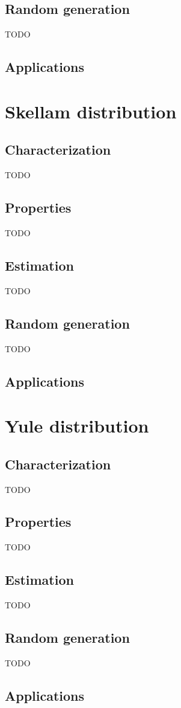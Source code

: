 \subsection{Random generation}
TODO
\subsection{Applications}

\section{Skellam distribution}
\subsection{Characterization}
TODO
\subsection{Properties}
TODO
\subsection{Estimation}
TODO
\subsection{Random generation}
TODO
\subsection{Applications}

\section{Yule distribution}
\subsection{Characterization}
TODO
\subsection{Properties}
TODO
\subsection{Estimation}
TODO
\subsection{Random generation}
TODO
\subsection{Applications}

